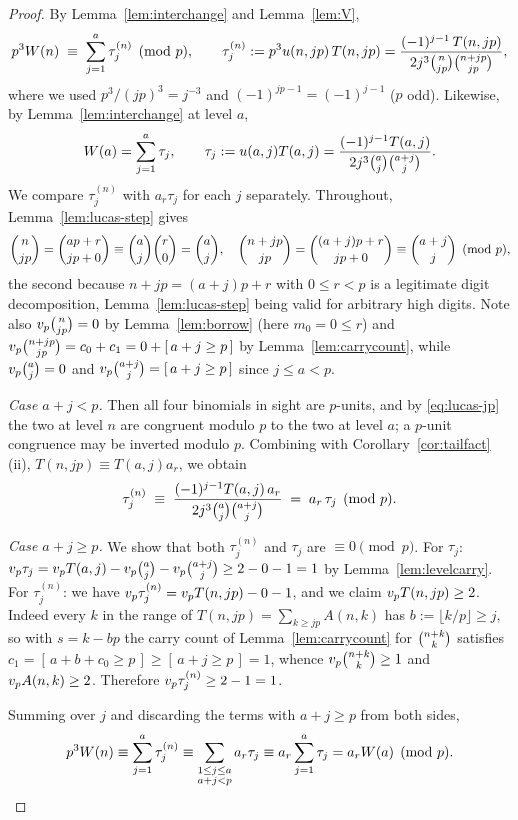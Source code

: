 \begin{proof}
By Lemma~\ref{lem:interchange} and Lemma~\ref{lem:V},
\[
   p^3W(n)\;\equiv\;\sum_{j=1}^{a}\tau_j^{(n)}\pmod p ,
   \qquad
   \tau^{(n)}_j:=p^3u(n,jp)\,T(n,jp)
   =\frac{(-1)^{j-1}\,T(n,jp)}{2j^3\binom{n}{jp}\binom{n+jp}{jp}},
\]
where we used $p^3/(jp)^3=j^{-3}$ and $(-1)^{jp-1}=(-1)^{j-1}$ ($p$ odd). Likewise, by
Lemma~\ref{lem:interchange} at level $a$,
\[
   W(a)=\sum_{j=1}^{a}\tau_j,
   \qquad
   \tau_j:=u(a,j)T(a,j)=\frac{(-1)^{j-1}T(a,j)}{2j^3\binom{a}{j}\binom{a+j}{j}} .
\]
We compare $\tau^{(n)}_j$ with $a_r\tau_j$ for each $j$ separately. Throughout,
Lemma~\ref{lem:lucas-step} gives
\begin{equation}\label{eq:lucas-jp}
   \binom{n}{jp}=\binom{ap+r}{jp+0}\equiv\binom{a}{j}\binom{r}{0}=\binom{a}{j},
   \quad
   \binom{n+jp}{jp}=\binom{(a+j)p+r}{jp+0}\equiv\binom{a+j}{j} \pmod p,
\end{equation}
the second because $n+jp=(a+j)p+r$ with $0\le r<p$ is a legitimate digit decomposition,
Lemma~\ref{lem:lucas-step} being valid for arbitrary high digits. Note also
$v_p\binom{n}{jp}=0$ by Lemma~\ref{lem:borrow} (here $m_0=0\le r$) and
$v_p\binom{n+jp}{jp}=c_0+c_1=0+[\,a+j\ge p\,]$ by Lemma~\ref{lem:carrycount}, while
$v_p\binom{a}{j}=0$ and $v_p\binom{a+j}{j}=[\,a+j\ge p\,]$ since $j\le a<p$.

\emph{Case $a+j<p$.} Then all four binomials in sight are $p$-units, and by
\eqref{eq:lucas-jp} the two at level $n$ are congruent modulo $p$ to the two at level
$a$; a $p$-unit congruence may be inverted modulo $p$. Combining with
Corollary~\ref{cor:tailfact}(ii), $T(n,jp)\equiv T(a,j)a_r$, we obtain
\[
   \tau^{(n)}_j\;\equiv\;\frac{(-1)^{j-1}T(a,j)\,a_r}{2j^3\binom{a}{j}\binom{a+j}{j}}
   \;=\;a_r\,\tau_j\pmod p .
\]

\emph{Case $a+j\ge p$.} We show that both $\tau^{(n)}_j$ and $\tau_j$ are $\equiv0\pmod
p$. For $\tau_j$: $v_p\tau_j=v_p T(a,j)-v_p\binom{a}{j}-v_p\binom{a+j}{j}\ge2-0-1=1$ by
Lemma~\ref{lem:levelcarry}. For $\tau^{(n)}_j$: we have
$v_p\tau^{(n)}_j=v_p T(n,jp)-0-1$, and we claim $v_p T(n,jp)\ge2$. Indeed every $k$ in the
range of $T(n,jp)=\sum_{k\ge jp}A(n,k)$ has $b:=\lfloor k/p\rfloor\ge j$, so with
$s=k-bp$ the carry count of Lemma~\ref{lem:carrycount} for $\binom{n+k}{k}$ satisfies
$c_1=[\,a+b+c_0\ge p\,]\ge[\,a+j\ge p\,]=1$, whence $v_p\binom{n+k}{k}\ge1$ and
$v_p A(n,k)\ge2$. Therefore $v_p\tau_j^{(n)}\ge2-1=1$.

Summing over $j$ and discarding the terms with $a+j\ge p$ from both sides,
\[
   p^3W(n)\equiv\sum_{j=1}^{a}\tau^{(n)}_j
   \equiv\sum_{\substack{1\le j\le a\\ a+j<p}}a_r\tau_j
   \equiv a_r\sum_{j=1}^{a}\tau_j=a_rW(a)\pmod p . \qedhere
\]
\end{proof}

